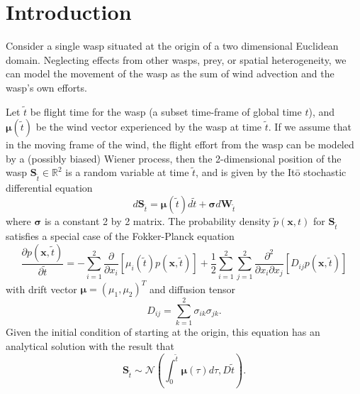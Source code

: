 \documentclass[12pt,english]{article}
\begin{document}
\setcounter{page}{1}
\pagestyle{fancy}
\chead{}
\lfoot{}
\cfoot{}
\rfoot{\thepage} %
\newcommand{\bv}[1]{\mathbf{#1}}
\newcommand{\bsy}{\boldsymbol}
\newcommand{\heavi}{\mathcal{H}}

\section*{Introduction}

Consider a single wasp situated at the origin of a two dimensional Euclidean domain. Neglecting effects from other wasps, prey, or spatial heterogeneity, we can model the movement of the wasp as the sum of wind advection and the wasp's own efforts.

Let $\tilde{t}$ be flight time for the wasp (a subset time-frame of global time $t$), and $\bsy\mu(\tilde{t})$ be the wind vector experienced by the wasp at time $\tilde{t}$. If we assume that in the moving frame of the wind, the flight effort from the wasp can be modeled by a (possibly biased) Wiener process, then the 2-dimensional position of the wasp $\bv{S}_{\tilde{t}}\in\mathbb{R}^2$ is a random variable at time $\tilde{t}$, and is given by the It\={o} stochastic differential equation
\begin{equation}
d\bv{S}_{\tilde{t}} = \bsy\mu(\tilde{t})d\tilde{t} + \bsy\sigma d\bv{W}_{\tilde{t}}\label{eqn:SDE}
\end{equation}
where $\bsy\sigma$ is a constant 2 by 2 matrix. The probability density $\tilde{p}(\bv{x},t)$ for $\bv{S}_{\tilde{t}}$ satisfies a special case of the Fokker-Planck equation
\begin{equation}
\frac{\partial p(\bv{x},\tilde{t})}{\partial \tilde{t}} = -\sum_{i=1}^2\frac{\partial}{\partial x_i}[\mu_i(\tilde{t})p(\bv{x},\tilde{t})] + \frac{1}{2}\sum_{i=1}^2\sum_{j=1}^2 \frac{\partial^2}{\partial x_i\partial x_j}[D_{ij}p(\bv{x},\tilde{t})]
\end{equation}
with drift vector $\bsy\mu=(\mu_1,\mu_2)^T$ and diffusion tensor
\begin{equation*}
D_{ij}=\sum_{k=1}^2 \sigma_{ik}\sigma_{jk}.
\end{equation*}
Given the initial condition of starting at the origin, this equation has an analytical solution with the result that
\begin{equation}
\bv{S}_{\tilde{t}} \sim \mathcal{N}(\int_0^{\tilde{t}}\bsy\mu(\tau)d\tau,D\tilde{t}).\label{eqn:pdf}
\end{equation}
\end{document}

